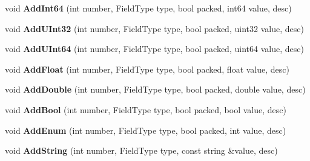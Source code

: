 \begin{DoxyCompactItemize}
void {\bfseries Add\+Int64} (int number, Field\+Type type, bool packed, int64 value, desc)
\item 
\mbox{\label{classgoogle_1_1protobuf_1_1internal_1_1ExtensionSet_a0992e25a2793f57e134cff7376e9aa6f}} 
void {\bfseries Add\+U\+Int32} (int number, Field\+Type type, bool packed, uint32 value, desc)
\item 
\mbox{\label{classgoogle_1_1protobuf_1_1internal_1_1ExtensionSet_a2e8e71aa5f3a54117a5d4f5a1e651ebe}} 
void {\bfseries Add\+U\+Int64} (int number, Field\+Type type, bool packed, uint64 value, desc)
\item 
\mbox{\label{classgoogle_1_1protobuf_1_1internal_1_1ExtensionSet_a054cce2f85d23e28db98c92132c2fae5}} 
void {\bfseries Add\+Float} (int number, Field\+Type type, bool packed, float value, desc)
\item 
\mbox{\label{classgoogle_1_1protobuf_1_1internal_1_1ExtensionSet_a76f34c5d83e9f3f0aaa8d95a1c727f18}} 
void {\bfseries Add\+Double} (int number, Field\+Type type, bool packed, double value, desc)
\item 
\mbox{\label{classgoogle_1_1protobuf_1_1internal_1_1ExtensionSet_ab6694ced2548a29183b75fc1bd2b9883}} 
void {\bfseries Add\+Bool} (int number, Field\+Type type, bool packed, bool value, desc)
\item 
\mbox{\label{classgoogle_1_1protobuf_1_1internal_1_1ExtensionSet_ad32e93a029746e797035c00b381aa721}} 
void {\bfseries Add\+Enum} (int number, Field\+Type type, bool packed, int value, desc)
\item 
\mbox{\label{classgoogle_1_1protobuf_1_1internal_1_1ExtensionSet_a6ab057273b9d0f7154b4b33142d75239}} 
void {\bfseries Add\+String} (int number, Field\+Type type, const string \&value, desc)
\item 
\mbox{\label{classgoogle_1_1protobuf_1_1internal_1_1ExtensionSet_ab4b014feb09fc2c9fcb414e8f96772cb}} 

\end{DoxyCompactItemize}
